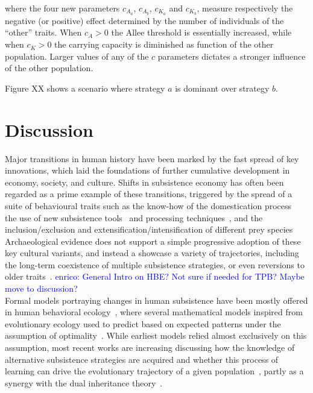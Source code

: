 \documentclass[preprint,authoryear]{elsarticle}
\newcommand{\memo}[2]{\textcolor{#1}{#2}}
\newcommand{\enrico}[1]{\memo{blue}{enrico: #1\\}}
\begin{document}
where the four new parameters $c_{A_a}$, $c_{A_b}$, $c_{K_a}$ and $c_{K_b}$, measure respectively the negative (or positive) effect determined by the number of individuals of the “other” traits. When $c_{A}>0$ the Allee threshold is essentially increased, while when $c_{K}>0$ the carrying capacity is diminished as function of the other population. Larger values of any of the $c$ parameters dictates a stronger influence of the other population. 

Figure XX shows a scenario where strategy $a$ is dominant over strategy $b$.

\section{Discussion}

Major transitions in human history have been marked by the fast spread of key innovations, which laid the foundations of further cumulative development in economy, society, and culture. Shifts in subsistence economy has often been regarded as a prime example of these transitions, triggered by the spread of a suite of behavioural traits such as the know-how of the domestication process~\citep{barker2006} the use of new subsistence tools~\citep{petraglia_population_2009} and processing techniques~\citep{molleson1993}, and the inclusion/exclusion and extensification/intensification of different prey species %
Archaeological evidence does not support a simple progressive adoption of these key cultural variants, and instead a showcase a variety of trajectories, including the long-term coexistence of multiple subsistence strategies, or even reversions to older traits~\citep{rowley2001}.  
\enrico{General Intro on HBE? Not sure if needed for TPB? Maybe move to discussion?}
Formal models portraying changes in human subsistence have been mostly offered in human behavioral ecology~\citep{smith1992,bird2006,kennett2006}, where several mathematical models inspired from evolutionary ecology %
 used to predict  based on expected patterns under the assumption of optimality~\citep{belovsky1988}. 
While earliest models relied almost exclusively on this assumption, most recent works are increasing discussing how the knowledge of alternative subsistence strategies are acquired %
and whether this process of learning can drive the evolutionary trajectory of a given population~\citep{henrich1998}, partly as a synergy with the dual inheritance theory~\citep{boyd1985}. 
\end{document}
